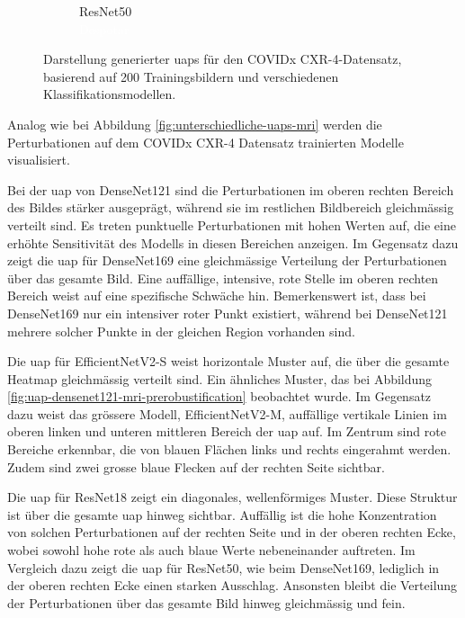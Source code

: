 \begin{figure}[H]
\begin{subfigure}{0.16\linewidth}
        \caption{ResNet50\\\textcolor{white}{Despotar}}
    \end{subfigure}
    \caption{Darstellung generierter \acrshort{uap}s für den COVIDx CXR-4-Datensatz, basierend auf 200 Trainingsbildern und verschiedenen Klassifikationsmodellen.}
    \label{fig:unterschiedliche-uaps-covid}
\end{figure}

Analog wie bei Abbildung \ref{fig:unterschiedliche-uaps-mri} werden die Perturbationen auf dem COVIDx CXR-4 Datensatz trainierten Modelle visualisiert.

Bei der \acrshort{uap} von DenseNet121 sind die Perturbationen im oberen rechten Bereich des Bildes stärker ausgeprägt, während sie im restlichen Bildbereich gleichmässig verteilt sind. Es treten punktuelle Perturbationen mit hohen Werten auf, die eine erhöhte Sensitivität des Modells in diesen Bereichen anzeigen. Im Gegensatz dazu zeigt die \acrshort{uap} für DenseNet169 eine gleichmässige Verteilung der Perturbationen über das gesamte Bild. Eine auffällige, intensive, rote Stelle im oberen rechten Bereich weist auf eine spezifische Schwäche hin. Bemerkenswert ist, dass bei DenseNet169 nur ein intensiver roter Punkt existiert, während bei DenseNet121 mehrere solcher Punkte in der gleichen Region vorhanden sind.

Die \acrshort{uap} für EfficientNetV2-S weist horizontale Muster auf, die über die gesamte Heatmap gleichmässig verteilt sind. Ein ähnliches Muster, das bei Abbildung \ref{fig:uap-densenet121-mri-prerobustification} beobachtet wurde. Im Gegensatz dazu weist das grössere Modell, EfficientNetV2-M, auffällige vertikale Linien im oberen linken und unteren mittleren Bereich der \acrshort{uap} auf. Im Zentrum sind rote Bereiche erkennbar, die von blauen Flächen links und rechts eingerahmt werden. Zudem sind zwei grosse blaue Flecken auf der rechten Seite sichtbar.

Die \acrshort{uap} für ResNet18 zeigt ein diagonales, wellenförmiges Muster. Diese Struktur ist über die gesamte \acrshort{uap} hinweg sichtbar. Auffällig ist die hohe Konzentration von solchen Perturbationen auf der rechten Seite und in der oberen rechten Ecke, wobei sowohl hohe rote als auch blaue Werte nebeneinander auftreten. Im Vergleich dazu zeigt die \acrshort{uap} für ResNet50, wie beim DenseNet169, lediglich in der oberen rechten Ecke einen starken Ausschlag. Ansonsten bleibt die Verteilung der Perturbationen über das gesamte Bild hinweg gleichmässig und fein.

\newpage